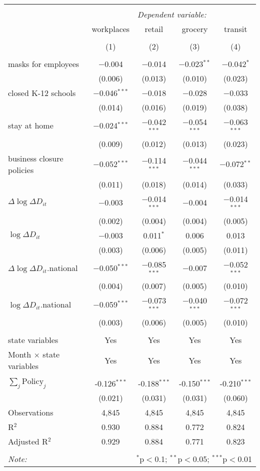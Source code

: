 \begin{tabular}{@{\extracolsep{1pt}}lcccc} 
\\[-1.8ex]\hline 
\hline \\[-1.8ex] 
 & \multicolumn{4}{c}{\textit{Dependent variable:}} \\ 
\cline{2-5} 
 & workplaces & retail & grocery & transit \\ 
\\[-1.8ex] & (1) & (2) & (3) & (4)\\ 
\hline \\[-1.8ex] 
 masks for employees & $-$0.004 & $-$0.014 & $-$0.023$^{**}$ & $-$0.042$^{*}$ \\ 
  & (0.006) & (0.013) & (0.010) & (0.023) \\ 
  closed K-12 schools & $-$0.046$^{***}$ & $-$0.018 & $-$0.028 & $-$0.033 \\ 
  & (0.014) & (0.016) & (0.019) & (0.038) \\ 
  stay at home & $-$0.024$^{***}$ & $-$0.042$^{***}$ & $-$0.054$^{***}$ & $-$0.063$^{***}$ \\ 
  & (0.009) & (0.012) & (0.013) & (0.023) \\ 
  business closure policies & $-$0.052$^{***}$ & $-$0.114$^{***}$ & $-$0.044$^{***}$ & $-$0.072$^{**}$ \\ 
  & (0.011) & (0.018) & (0.014) & (0.033) \\ 
  $\Delta \log \Delta D_{it}$ & $-$0.003 & $-$0.014$^{***}$ & $-$0.004 & $-$0.014$^{***}$ \\ 
  & (0.002) & (0.004) & (0.004) & (0.005) \\ 
  $\log \Delta D_{it}$ & $-$0.003 & 0.011$^{*}$ & 0.006 & 0.013 \\ 
  & (0.003) & (0.006) & (0.005) & (0.011) \\ 
  $\Delta \log \Delta D_{it}$.national & $-$0.050$^{***}$ & $-$0.085$^{***}$ & $-$0.007 & $-$0.052$^{***}$ \\ 
  & (0.004) & (0.007) & (0.005) & (0.010) \\ 
  $\log \Delta D_{it}$.national & $-$0.059$^{***}$ & $-$0.073$^{***}$ & $-$0.040$^{***}$ & $-$0.072$^{***}$ \\ 
  & (0.003) & (0.006) & (0.005) & (0.010) \\ 
 \hline \\[-1.8ex] 
state variables & Yes & Yes & Yes & Yes \\ 
Month $\times$ state variables & Yes & Yes & Yes & Yes \\ 
\hline \\[-1.8ex] 
$\sum_j \mathrm{Policy}_j$ & -0.126$^{***}$ & -0.188$^{***}$ & -0.150$^{***}$ & -0.210$^{***}$ \\ 
 & (0.021) & (0.031) & (0.031) & (0.060) \\ 
Observations & 4,845 & 4,845 & 4,845 & 4,845 \\ 
R$^{2}$ & 0.930 & 0.884 & 0.772 & 0.824 \\ 
Adjusted R$^{2}$ & 0.929 & 0.884 & 0.771 & 0.823 \\ 
\hline 
\hline \\[-1.8ex] 
\textit{Note:}  & \multicolumn{4}{r}{$^{*}$p$<$0.1; $^{**}$p$<$0.05; $^{***}$p$<$0.01} \\ 
\end{tabular} 